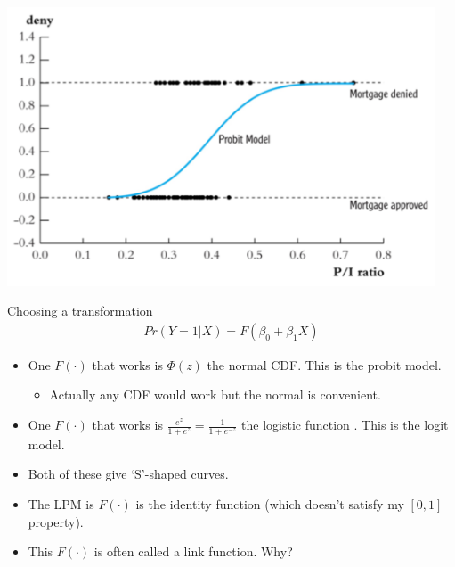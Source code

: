 \documentclass[aspectratio=169]{beamer}
\begin{document}
\begin{frame}
\begin{center}
\includegraphics[width=5in]{resources/probit.pdf}
\end{center}
\end{frame}

\begin{frame}{Choosing a transformation}
\begin{eqnarray*}
Pr(Y=1 | X) = F(\beta_0 + \beta_1 X)
\end{eqnarray*}
\begin{itemize}
\item One $F(\cdot)$ that works is $\Phi(z)$ the normal CDF. This is the \alert{probit} model.
\begin{itemize}
\item Actually any CDF would work but the normal is convenient.
\end{itemize}
\item One $F(\cdot)$ that works is $\frac{e^z}{1+ e^z}=\frac{1}{1+e^{-z}}$ the logistic function . This is the \alert{logit} model.
\item Both of these give `S'-shaped curves.
\item The LPM is $F(\cdot)$ is the \alert{identity function} (which doesn't satisfy my $[0,1]$ property).
\item This $F(\cdot)$ is often called a \alert{link function}. Why?
\end{itemize}
\end{frame}
\end{document}
